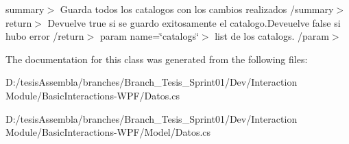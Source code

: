 summary$>$ Guarda todos los catalogos con los cambios realizados /summary$>$ return$>$ Devuelve true si se guardo exitosamente el catalogo.\-Deveuelve false si hubo error /return$>$ param name=\char`\"{}catalogs\char`\"{}$>$ list de los catalogs. /param$>$ 

The documentation for this class was generated from the following files\-:\begin{DoxyCompactItemize}
\item 
D\-:/tesis\-Assembla/branches/\-Branch\-\_\-\-Tesis\-\_\-\-Sprint01/\-Dev/\-Interaction Module/\-Basic\-Interactions-\/\-W\-P\-F/Datos.\-cs\item 
D\-:/tesis\-Assembla/branches/\-Branch\-\_\-\-Tesis\-\_\-\-Sprint01/\-Dev/\-Interaction Module/\-Basic\-Interactions-\/\-W\-P\-F/\-Model/Datos.\-cs\end{DoxyCompactItemize}
